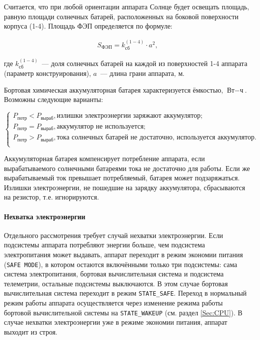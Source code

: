 \documentclass[12pt,a4paper]{article}
\begin{document}
Считается, что при любой ориентации аппарата Солнце будет освещать площадь, равную площади
солнечных батарей, расположенных на боковой поверхности корпуса (1-4). Площадь ФЭП
определяется по формуле:

\begin{eqnarray}
  S_{\text{ФЭП}} = k^{(1-4)}_{\text{сб}} \cdot a^2,
\end{eqnarray}

где $k^{(1-4)}_{\text{сб}}$~--- доля солнечных батарей на каждой из поверхностей 1-4
аппарата (параметр конструирования), $a$~--– длина грани аппарата, м.

Бортовая химическая аккумуляторная батарея характеризуется ёмкостью, $\text{Вт}-\text{ч}$. Возможны
следующие варианты:

$$
 \left\{
  \begin{array}{l}
    P_{\text{потр}} < P_{\text{выраб}}, \text{излишки электроэнергии заряжают
      аккумулятор};\\
    P_{\text{потр}} = P_{\text{выраб}}, \text{аккумулятор не используется};\\
    P_{\text{потр}} > P_{\text{выраб}}, \text{тока солнечных батарей не достаточно,
      используется аккумулятор}.\\
  \end{array}
\right.
$$

Аккумуляторная батарея компенсирует потребление аппарата, если вырабатываемого солнечными
батареями тока не достаточно для работы. Если же вырабатываемый ток превышает
потребляемый, батарея может подзаряжаться. Излишки электроэнергии, не пошедшие на зарядку
аккумулятора, сбрасываются на резистор, т.е. игнорируются.

\paragraph{Нехватка электроэнергии}

Отдельного рассмотрения требует случай нехватки электроэнергии. Если подсистемы аппарата
потребляют энергии больше, чем подсистема электропитания может выдавать, аппарат переходит
в режим экономии питания (\verb'SAFE MODE'), в котором остаются включёнными только три
подсистемы: сама система электропитания, бортовая вычислительная система и подсистема
телеметрии, остальные подсистемы выключаются. В этом случае бортовая вычислительная
система переходит в режим \verb'STATE_SAFE'. Переход в нормальный режим работы аппарата
осуществляется через изменение режима работы бортовой вычислительной системы на
\verb'STATE_WAKEUP' (см. раздел \ref{Sec:CPU}). В случае нехватки электроэнергии уже в режиме экономии
питания, аппарат выходит из строя.
\end{document}
